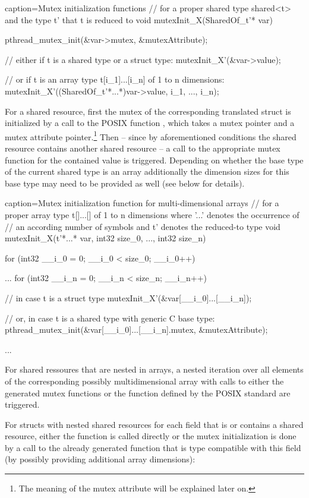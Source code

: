 \begin{ccode}{caption=Mutex initialization functions}
// for a proper shared type shared<t> and the type t' that t is reduced to
void mutexInit_X(SharedOf_t'* var) { 
  pthread_mutex_init(&var->mutex, &mutexAttribute);
  
  // either if t is a shared type or a struct type:
  mutexInit_X'(&var->value); 
  
  // or if t is an array type t[i_1]...[i_n] of 1 to n dimensions:
  mutexInit_X'((SharedOf_t'*...*)var->value, i_1, ..., i_n); 
}
\end{ccode}
For a shared resource, first the mutex of the corresponding translated struct is initialized by a call to the POSIX function , which takes a mutex pointer and a mutex attribute pointer.\footnote{The meaning of the mutex attribute will be explained later on.} Then -- since by aforementioned conditions the shared resource contains another shared resource -- a call to the appropriate mutex function for the contained value is triggered. Depending on whether the base type of the current shared type is an array additionally the dimension sizes for this base type may need to be provided as well (see below for details).

\begin{ccode}{caption=Mutex initialization function for multi-dimensional arrays}
// for a proper array type t[]...[] of 1 to n dimensions where '...' denotes the occurrence of 
// an according number of symbols and t' denotes the reduced-to type
void mutexInit_X(t'*...* var, int32 size_0, ..., int32 size_n) { 
  for (int32 __i_0 = 0; __i_0 < size_0; __i_0++) { 
    ...
      for (int32 __i_n = 0; __i_n < size_n; __i_n++) {
        // in case t is a struct type
        mutexInit_X'(&var[__i_0]...[__i_n]);
        
        // or, in case t is a shared type with generic C base type:
        pthread_mutex_init(&var[__i_0]...[__i_n].mutex, &mutexAttribute);
      }
    ...
  } 
}
\end{ccode}
For shared ressoures that are nested in arrays, a nested iteration over all elements of the corresponding possibly multidimensional array with calls to either the generated mutex functions or the function defined by the POSIX standard are triggered.

For structs with nested shared resources for each field that is or contains a shared resource, either the  function is called directly or the mutex initialization is done by a call to the already generated function that is type compatible with this field (by possibly providing additional array dimensions):

